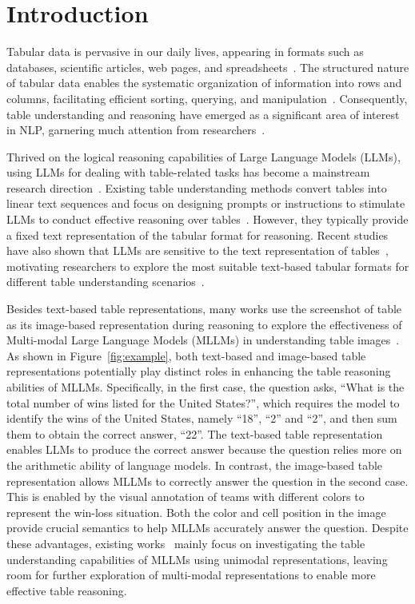 \section{Introduction}
Tabular data is pervasive in our daily lives, appearing in formats such as databases, scientific articles, web pages, and spreadsheets~\cite{chen2000mining,hurst2000interpretation,hu2023chatdb}. The structured nature of tabular data enables the systematic organization of information into rows and columns, facilitating efficient sorting, querying, and manipulation~\citep{pujara2021tables, chen2020open}. Consequently, table understanding and reasoning have emerged as a significant area of interest in NLP, garnering much attention from researchers~\citep{bao2018table, zhang2024survey}.


Thrived on the logical reasoning capabilities of Large Language Models (LLMs), using LLMs for dealing with table-related tasks has become a mainstream research direction~\cite{chen2023large,zhang2024survey,dong2024large}. Existing table understanding methods convert tables into linear text sequences and focus on designing prompts or instructions to stimulate LLMs to conduct effective reasoning over tables~\cite{chen2023large,wang2024chainoftable}. However, they typically provide a fixed text representation of the tabular format for reasoning. Recent studies have also shown that LLMs are sensitive to the text representation of tables~\cite{liu-etal-2024-rethinking}, motivating researchers to explore the most suitable text-based tabular formats for different table understanding scenarios~\cite{zhang2024flextaf,sui2024table,singha2023tabular}.


Besides text-based table representations, many works use the screenshot of table as its image-based representation during reasoning to explore the effectiveness of Multi-modal Large Language Models (MLLMs) in understanding table images~\cite{deng2024tables,ZhengFSS0J024}. As shown in Figure~\ref{fig:example}, both text-based and image-based table representations potentially play distinct roles in enhancing the table reasoning abilities of MLLMs. Specifically, in the first case, the question asks, ``What is the total number of wins listed for the United States?'', which requires the model to identify the wins of the United States, namely ``18'', ``2'' and ``2'', and then sum them to obtain the correct answer, ``22''. The text-based table representation enables LLMs to produce the correct answer because the question relies more on the arithmetic ability of language models. In contrast, the image-based table representation allows MLLMs to correctly answer the question in the second case. This is enabled by the visual annotation of teams with different colors to represent the win-loss situation. Both the color and cell position in the image provide crucial semantics to help MLLMs accurately answer the question. Despite these advantages, existing works~\cite{deng2024tables,ZhengFSS0J024} mainly focus on investigating the table understanding capabilities of MLLMs using unimodal representations, leaving room for further exploration of multi-modal representations to enable more effective table reasoning.

